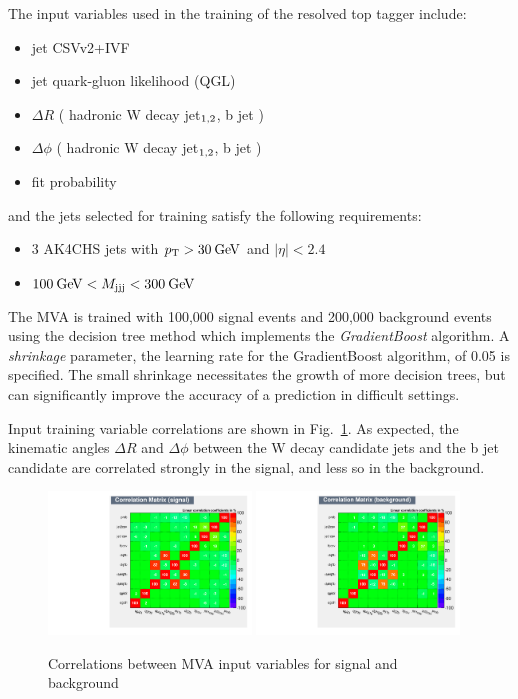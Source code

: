 The input variables used in the training of the resolved top tagger include:
\begin{itemize}
\item jet CSVv2+IVF
\item jet quark-gluon likelihood (QGL)
\item $\Delta R$ ( hadronic W decay jet$_{\mbox{\scriptsize{1,2}}}$, b jet )
\item $\Delta \phi$ ( hadronic W decay jet$_{\mbox{\scriptsize{1,2}}}$, b jet )
\item fit probability 
\end{itemize}

and the jets selected for training satisfy the following requirements: 
\begin{itemize}
\item 3 AK4CHS jets with $p_\mathrm{T}>30\:\mathrm{Ge\kern -0.1em V}$ and $|\eta|<2.4$	
\item $100\:\mathrm{Ge\kern -0.1em V}<M_{\mbox{\scriptsize{jjj}}}<300\: \mathrm{Ge\kern -0.1em V}$
\end{itemize}

The MVA is trained with 100,000 signal events and 200,000 background events using the decision tree method which implements the \textit{GradientBoost} algorithm. A \textit{shrinkage} parameter, the learning rate for the GradientBoost algorithm, of 0.05 is specified. The small shrinkage necessitates the growth of more decision trees, but can significantly improve the accuracy of a prediction in difficult settings.

Input training variable correlations are shown in Fig.~\ref{fig:corr}. As expected, the kinematic angles $\Delta R$ and $\Delta\phi$ between the W decay candidate jets and the b jet candidate are correlated strongly in the signal, and less so in the background. 

\begin{figure}[htbp]
	\centering
	\includegraphics[width=0.48\textwidth]{figures/CorrelationMatrixS.pdf}
	\includegraphics[width=0.48\textwidth]{figures/CorrelationMatrixB.pdf}
	\caption{Correlations between MVA input variables for signal and background}
	\label{fig:corr}
\end{figure}

